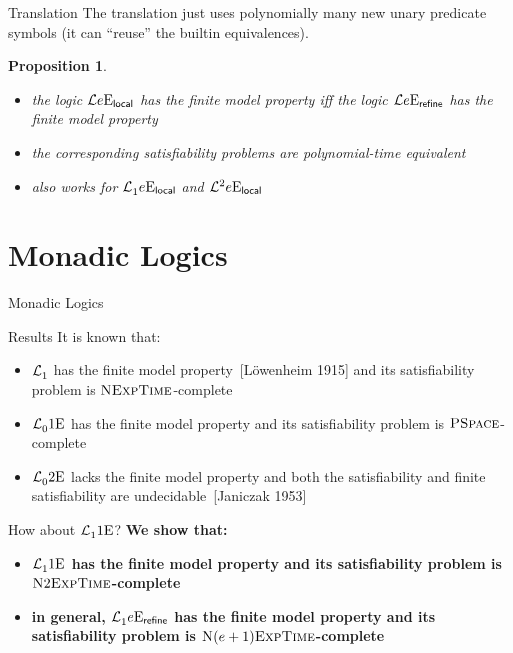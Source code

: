 \documentclass{beamer}
\newtheorem{proposition}{Proposition}
\begin{document}
\begin{frame}{Translation}
The translation just uses polynomially many new unary predicate symbols (it can
``reuse'' the builtin equivalences).
\begin{proposition}
\begin{itemize}
  \item
  the logic $\mathcal{L}{e}\mathrm{E}_{\mathsf{local}}$ has the finite model property iff
  the logic $\mathcal{L}{e}\mathrm{E}_{\mathsf{refine}}$ has the finite model property
  
  \item
  the corresponding satisfiability problems are polynomial-time equivalent
  
  \item
  also works for $\mathcal{L}^{{}}_{1}{e}\mathrm{E}_{\mathsf{local}}$ and
  $\mathcal{L}^{2}_{{}}{e}\mathrm{E}_{\mathsf{local}}$
\end{itemize}
\end{proposition}
\end{frame}

\section{Monadic Logics}
\begin{frame}

{\LARGE Monadic Logics}
\end{frame}
\begin{frame}{Results}
It is known that:
\begin{itemize}
  \item
  $\mathcal{L}^{{}}_{1}$ has the finite model property~{[L{\"o}wenheim 1915]} and
  its satisfiability problem is $\text{\normalfont{\scshape NExpTime}}$-complete
  
  \pause
  \item
  $\mathcal{L}^{{}}_{0}{1}\mathrm{E}_{{}}$ has the finite model property and
  its satisfiability problem is $\text{\normalfont{\scshape PSpace}}$-complete
  
  \pause
  \item
  $\mathcal{L}^{{}}_{0}{2}\mathrm{E}_{{}}$ lacks the finite model property
  and both the satisfiability and finite satisfiability are
  undecidable~{[Janiczak 1953]}
\end{itemize}

\pause
How about $\mathcal{L}^{{}}_{1}{1}\mathrm{E}_{{}}$?
\pause
\textbf{We show that:}
\begin{itemize}
  \item\textbf{
  $\mathcal{L}^{{}}_{1}{1}\mathrm{E}_{{}}$ has the finite model property and its
  satisfiability problem is $\text{\normalfont{\scshape N}}2\text{\normalfont{\scshape ExpTime}}$-complete}
  
  \item\textbf{
  in general, $\mathcal{L}^{{}}_{1}{e}\mathrm{E}_{\mathsf{refine}}$ has the finite model property and
  its satisfiability problem is $\text{\normalfont{\scshape N}}(e+1)\text{\normalfont{\scshape ExpTime}}$-complete}
\end{itemize}
\end{frame}
\end{document}
